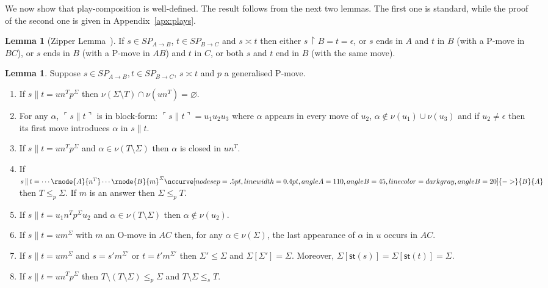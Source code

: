 \documentclass{CSML}
\theoremstyle{definition}\newtheorem{definition}[thm]{Definition}
\theoremstyle{definition}\newtheorem{example}[thm]{Example}
\theoremstyle{definition}\newtheorem{proposition}[thm]{Proposition}
\theoremstyle{definition}\newtheorem{lemma}[thm]{Lemma}
\theoremstyle{definition}\newtheorem{theorem}[thm]{Theorem}
\theoremstyle{definition}\newtheorem{corollary}[thm]{Corollary}
\theoremstyle{definition}\newtheorem{remark}[thm]{Remark}
\renewcommand\Sigma{\varSigma}
\newcommand\justf[3][]{\nccurve[nodesep=.5pt,linewidth=0.4pt,angleA=110,angleB=45,linecolor=darkgray#1]{->}{#2}{#3}}
\newcommand\Tau{T}
\newcommand\arr{\rightarrow}
\newcommand\rest{\upharpoonright}
\newcommand\iseq{\mathop{\|}}
\newcommand\ee\epsilon
\newcommand\remv{\setminus}
\newcommand\Splays[1]{\mathit{SP}_{#1}}
\newcommand\st[1]{\mathsf{st}(#1)}
\newcommand\substore\leq
\newcommand\Substore{\leq_p}
\newcommand\substorE{\leq_s}
\newcommand\pview[1]{\ulcorner{#1}\urcorner}
\newcommand\pv[1]{\pview{#1}}
\newcommand\na\alpha
\begin{document}
We now show that play-composition is well-defined. The result follows from the next two lemmas.
The first one is standard, while the proof of the second one is given in Appendix~\ref{apx:plays}.

\begin{lemma}[Zipper Lemma~\cite{HY97}]
If $s\in\Splays{A\arr B}$, $t\in\Splays{B\arr C}$ and $s\asymp t$ then either $s\,{\rest}B=t=\epsilon$,
or $s$ ends in $A$ and $t$ in $B$ (with a P-move in $BC$), 
or $s$ ends in $B$ (with a P-move in $AB$) and $t$ in $C$, 
or both $s$ and $t$ end in $B$ (with the same move).
\end{lemma}

\begin{lemma}\label{l:inter}
Suppose $s\in\Splays{A\arr B},t\in\Splays{B\arr C}$, $s\asymp t$ and $p$ a generalised P-move.
\begin{enumerate}\renewcommand{\theenumi}{\alph{enumi}}
  \item If $s\iseq t=un^\Tau p^\Sigma$ then $\nu(\Sigma\remv\Tau)\cap\nu(un^\Tau)=\varnothing$.
  \item For any $\na$, $\pv{s\iseq t}$ is in block-form: $\pv{s\iseq t}=u_1u_2u_3$ where $\na$ appears in every move of $u_2$, $\na\notin\nu(u_1)\cup\nu(u_3)$  and if $u_2\neq\ee$ then its first move introduces $\na$ in $s\iseq t$.
  \item If $s\iseq t=un^\Tau p^\Sigma$ and $\na\in\nu(\Tau\remv\Sigma)$ then $\na$ is closed in $un^\Tau$.
  \item If $s\iseq t=\cdots \rnode{A}{n^\Tau}\cdots \rnode{B}{m}^\Sigma\justf[,angleB=20]{B}{A}$ then $\Tau\Substore\Sigma$. If $m$ is an answer then $\Sigma\Substore\Tau$.
  \item If $s\iseq t=u_1n^\Tau p^\Sigma u_2$ and $\na\in\nu(\Tau\remv\Sigma)$ then $\na\notin\nu(u_2)$.
  \item If $s\iseq t=um^\Sigma$ with $m$ an O-move in $AC$ then, for any $\na\in\nu(\Sigma)$, the last appearance of $\na$ in $u$ occurs in $AC$.
  \item If $s\iseq t=um^\Sigma$ and $s=s'm^{\Sigma'}$ or $t=t'm^{\Sigma'}$ then $\Sigma'\substore\Sigma$ and $\Sigma[\Sigma']=\Sigma$. Moreover, $\Sigma[\st{s}]=\Sigma[\st{t}]=\Sigma$.
    \item If $s\iseq t=un^\Tau p^\Sigma$ then $\Tau\remv(\Tau\remv\Sigma)\Substore\Sigma$ and $\Tau\remv\Sigma\substorE\Tau$.
\end{enumerate}
\end{lemma}
\end{document}

